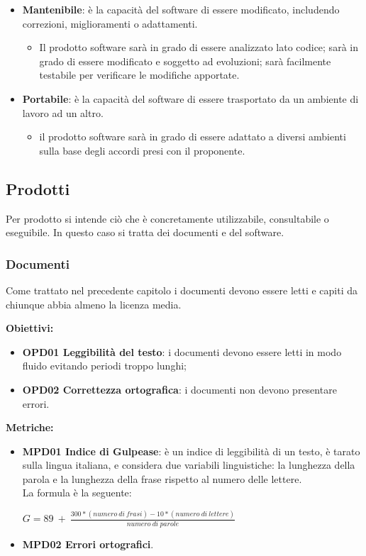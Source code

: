 \documentclass[../piano_di_qualifica.tex]{subfiles}
\begin{document}
\begin{itemize}
	\item \textbf{Mantenibile}: è la capacità del software di essere modificato, includendo correzioni, miglioramenti o adattamenti.
	      \begin{itemize}
		      \item Il prodotto software sarà in grado di essere analizzato lato codice; sarà in grado di essere modificato e soggetto ad evoluzioni; sarà facilmente testabile per verificare le modifiche apportate.
	      \end{itemize}

	\item \textbf{Portabile}: è la capacità del software di essere trasportato da un ambiente di lavoro ad un altro.
	      \begin{itemize}
		      \item il prodotto software sarà in grado di essere adattato a diversi ambienti sulla base degli accordi presi con il proponente.
	      \end{itemize}
\end{itemize}

\subsection{Prodotti}
Per prodotto si intende ciò che è concretamente utilizzabile, consultabile o eseguibile. In questo caso si tratta dei documenti e del software.

\subsubsection{Documenti}
Come trattato nel precedente capitolo i documenti devono essere letti e capiti da chiunque abbia almeno la licenza media.

\setlength{\parindent}{0pt}\textbf{Obiettivi:}
\smallbreak
\begin{itemize}
	\item \textbf{OPD01 Leggibilità del testo}: i documenti devono essere letti in modo fluido evitando periodi troppo lunghi;
	\item \textbf{OPD02 Correttezza ortografica}: i documenti non devono presentare errori.
\end{itemize}

\textbf{Metriche:}
\smallbreak
\begin{itemize}
	\item \textbf{MPD01 Indice di Gulpease}: è un indice di leggibilità di un testo, è tarato sulla lingua italiana, e considera due variabili linguistiche: la lunghezza della parola e la lunghezza della frase rispetto al numero delle lettere.\\
	La formula è la seguente:\par
	\begin{center}
		$G = 89\ +\ \frac{300 * (numero\ di\ frasi) - 10 * (numero\ di\ lettere)}{numero\ di\ parole} $
	\end{center}
	\item \textbf{MPD02 Errori ortografici}.
\end{itemize}
\end{document}
